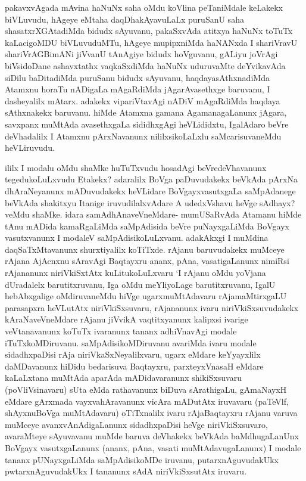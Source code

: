 \begin{artha}
pakavxvAgada mAvina haNuNx saha oMdu koVlina peTaniMdale keLakekx biVLuvudu, hAgeye eMtaha daqDhakAyavuLaLx puruSanU saha shasatxrXGAtadiMda bidudx sAyuvanu, pakaSxvAda atitxya haNuNx toTuTx kaLacigoMDU biVLuvuduMTu, hAgeye mupipxniMda haNANxda I shariVravU shariVrAGBimANi jiVvanU tAnAgiye bidudx hoVguvanu, gALiyu joVrAgi biVsidoDane ashavxtathx vaqkaSxdiMda haNuNx uduruvaMte deYvikavAda siDilu baDitadiMda puruSanu bidudx sAyuvanu, haqdayasAthxnadiMda Atamxnu horaTu nADigaLa mAgaRdiMda jAgarAvasethxge baruvanu, I dasheyalilx mAtarx. adakekx vipariVtavAgi nADiV mAgaRdiMda haqdaya sAthxnakekx baruvanu. hiMde Atamxna gamana AgamanagaLanunx jAgara, savxpanx muMtAda avasethxgaLa sididhxgAgi heVLididxtu, IgalAdaro beVre deVhadalilx I Atamxnu pArxNavanunx nililxsikoLaLxlu saMcarisuvaneMdu heVLiruvudu.
\end{artha}


\begin{artha}
ililx I modalu oMdu shaMke huTuTxvudu hosadAgi beVredeVhavanunx tegedukoLuLxvudu Etakekx? adaralilx BoVga paDuvudakekx beVkAda pArxNa dhAraNeyanunx mADuvudakekx heVLidare BoVgayxvasutxgaLa saMpAdanege beVkAda shakitxyu Itanige iruvudilalxvAdare A udedxVshavu heVge sAdhayx?veMdu shaMke. idara samAdhAnaveVneMdare- mumUSaRvAda Atamanu hiMde tAnu mADida kamaRgaLiMda saMpAdisida beVre puNayxgaLiMda BoVgayx vasutxvanunx I modaleV saMpAdisikoLuLxvanu. adakAkxgi I muMdina daqSaTxMtavanunx shurxtiyalilx koTiTxde. rAjanu baruvudakekx muMceye rAjana AjAcnxnu sAravAgi Baqtayxru ananx, pAna, vasatigaLanunx nimiRsi rAjananunx niriVkiSxtAtx kuLitukoLuLxvaru `I rAjanu oMdu yoVjana dUradalelx barutitxruvanu, Iga oMdu meYliyoLage barutitxruvanu, IgalU hebAbxgalige oMdiruvaneMdu hiVge ugarxmuMtAdavaru rAjamaMtirxgaLU parasapxra heVLutAtx niriVkiSxsuvaru, rAjananunx ivaru niriVkiSxsuvudakekx kAraNaveVneMdare rAjanu jiVvikA vaqtitxyanunx kalipxsi ivarige veVtanavanunx koTuTx ivaranunx tananx adhiVnavAgi modale iTuTxkoMDiruvanu. saMpAdisikoMDiruvanu avariMda ivaru modale sidadhxpaDisi rAja niriVkaSxNeyalilxvaru, ugarx eMdare keYyayxlilx daMDavanunx hiDidu bedarisuva Baqtayxru, parxteyxVnasaH eMdare kaLaLxtana muMtAda aparAda mADidavaranunx shikiSxsuvaru (poVliVsinavaru) sUta eMda rathavanunx biDuva sArathigaLu, gAmaNayxH eMdare gArxmada vayxvahAravanunx vicAra mADutAtx iruvavaru (paTeVlf, shAyxnuBoVga muMtAdavaru) oTiTxnalilx ivaru rAjaBaqtayxru rAjanu varuva muMceye avanxvAnAdigaLanunx sidadhxpaDisi heVge niriVkiSxsuvaro, avaraMteye sAyuvavanu muMde baruva deVhakekx beVkAda baMdhugaLanUnx BoVgayx vasutxgaLanunx (ananx, pAna, vasati muMtAdavugaLanunx) I modale tananx pUNayxgaLiMda saMpAdisikoMDe iruvanu, putarxnAguvudakUkx pwtarxnAguvudakUkx I tananunx sAdA niriVkiSxsutAtx iruvaru. 
\end{artha}%


